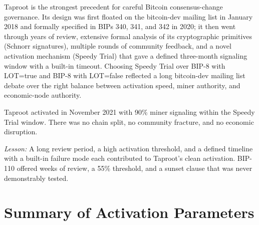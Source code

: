 \documentclass[11pt, twoside, openright]{book}
\begin{document}
Taproot is the strongest precedent for careful Bitcoin consensus-change governance. Its design was first floated on the bitcoin-dev mailing list in January 2018 and formally specified in BIPs 340, 341, and 342 in 2020; it then went through years of review, extensive formal analysis of its cryptographic primitives (Schnorr signatures), multiple rounds of community feedback, and a novel activation mechanism (Speedy Trial) that gave a defined three-month signaling window with a built-in timeout. Choosing Speedy Trial over BIP-8 with LOT=true and BIP-8 with LOT=false reflected a long bitcoin-dev mailing list debate over the right balance between activation speed, miner authority, and economic-node authority.

Taproot activated in November 2021 with 90\% miner signaling within the Speedy Trial window. There was no chain split, no community fracture, and no economic disruption.

\textit{Lesson:} A long review period, a high activation threshold, and a defined timeline with a built-in failure mode each contributed to Taproot's clean activation. BIP-110 offered weeks of review, a 55\% threshold, and a sunset clause that was never demonstrably tested.

\section{Summary of Activation Parameters}
\end{document}
